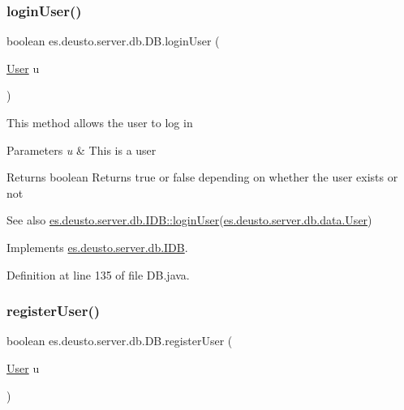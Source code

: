\subsubsection{\texorpdfstring{login\+User()}{loginUser()}}
{\footnotesize\ttfamily boolean es.\+deusto.\+server.\+db.\+D\+B.\+login\+User (\begin{DoxyParamCaption}\item[{\hyperlink{classes_1_1deusto_1_1server_1_1db_1_1data_1_1_user}{User}}]{u }\end{DoxyParamCaption})}

This method allows the user to log in 
\begin{DoxyParams}{Parameters}
{\em u} & This is a user \\
\hline
\end{DoxyParams}
\begin{DoxyReturn}{Returns}
boolean Returns true or false depending on whether the user exists or not 
\end{DoxyReturn}
\begin{DoxySeeAlso}{See also}
\hyperlink{interfacees_1_1deusto_1_1server_1_1db_1_1_i_d_b_a6e6196e5899fc93134223373ed8363a6}{es.\+deusto.\+server.\+db.\+I\+D\+B\+::login\+User}(\hyperlink{classes_1_1deusto_1_1server_1_1db_1_1data_1_1_user}{es.\+deusto.\+server.\+db.\+data.\+User}) 
\end{DoxySeeAlso}


Implements \hyperlink{interfacees_1_1deusto_1_1server_1_1db_1_1_i_d_b_a6e6196e5899fc93134223373ed8363a6}{es.\+deusto.\+server.\+db.\+I\+DB}.



Definition at line 135 of file D\+B.\+java.

\mbox{\label{classes_1_1deusto_1_1server_1_1db_1_1_d_b_a888f468b3fc2a05520fca9ac135823e3}} 
\subsubsection{\texorpdfstring{register\+User()}{registerUser()}}
{\footnotesize\ttfamily boolean es.\+deusto.\+server.\+db.\+D\+B.\+register\+User (\begin{DoxyParamCaption}\item[{\hyperlink{classes_1_1deusto_1_1server_1_1db_1_1data_1_1_user}{User}}]{u }\end{DoxyParamCaption})}

